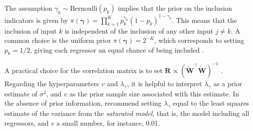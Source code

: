 The assumption \(\gamma_k \sim \text{Bernoulli}(p_k)\) implies that the prior on the inclusion indicators is given by \(\pi(\boldsymbol{\gamma}) = \prod_{k=1}^K p_k^{\gamma_k} (1 - p_k)^{1 - \gamma_k}\). This means that the inclusion of input \(k\) is independent of the inclusion of any other input \(j \neq k\). A common choice is the uniform prior \(\pi(\boldsymbol{\gamma}) = 2^{-K}\), which corresponds to setting \(p_k = 1/2\), giving each regressor an equal chance of being included \cite{Ishwaran2005}.

A practical choice for the correlation matrix is to set \(\mathbf{R} \propto (\tilde{\mathbf{W}}^{\top} \tilde{\mathbf{W}})^{-1}\) \cite{george1993variable}. Regarding the hyperparameters \(v\) and \(\lambda_{\gamma}\), it is helpful to interpret \(\lambda_{\gamma}\) as a prior estimate of \(\sigma^2\), and \(v\) as the prior sample size associated with this estimate. In the absence of prior information, \cite{george1997approaches} recommend setting \(\lambda_{\gamma}\) equal to the least squares estimate of the variance from the \textit{saturated model}, that is, the model including all regressors, and \(v\) a small number, for instance, 0.01.

